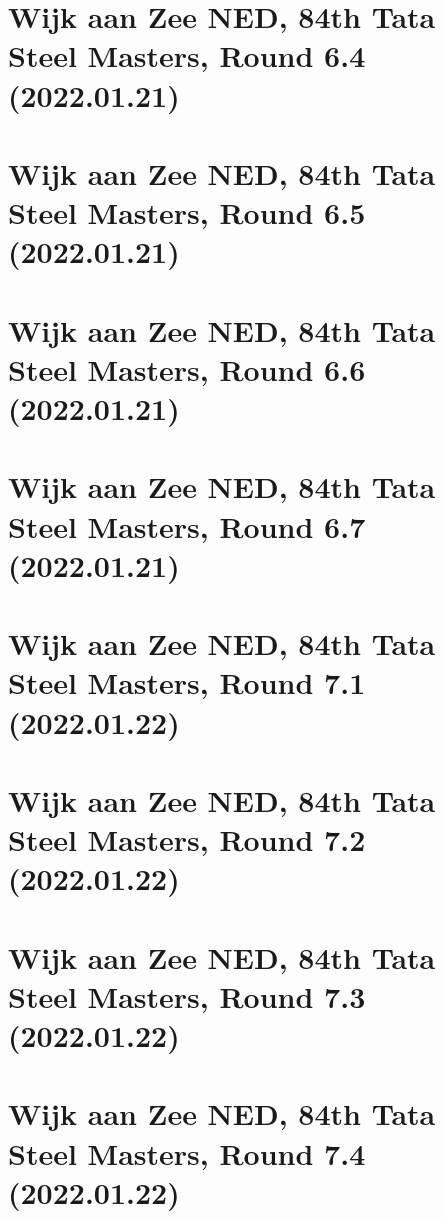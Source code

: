 \documentclass[11pt]{article}
\newcommand*\cleartoleftpage{%
   \clearpage
   \ifodd\value{page}\hbox{}\newpage\fi
}
\begin{document}
\cleartoleftpage

\section{Wijk aan Zee NED, 84th Tata Steel Masters, Round 6.4 (2022.01.21)}


\cleartoleftpage

\section{Wijk aan Zee NED, 84th Tata Steel Masters, Round 6.5 (2022.01.21)}


\cleartoleftpage

\section{Wijk aan Zee NED, 84th Tata Steel Masters, Round 6.6 (2022.01.21)}


\cleartoleftpage

\section{Wijk aan Zee NED, 84th Tata Steel Masters, Round 6.7 (2022.01.21)}


\cleartoleftpage

\section{Wijk aan Zee NED, 84th Tata Steel Masters, Round 7.1 (2022.01.22)}


\cleartoleftpage

\section{Wijk aan Zee NED, 84th Tata Steel Masters, Round 7.2 (2022.01.22)}


\cleartoleftpage

\section{Wijk aan Zee NED, 84th Tata Steel Masters, Round 7.3 (2022.01.22)}


\cleartoleftpage

\section{Wijk aan Zee NED, 84th Tata Steel Masters, Round 7.4 (2022.01.22)}

\end{document}
